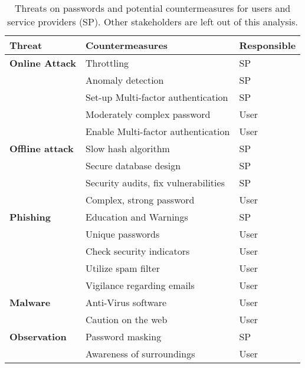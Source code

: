\begin{table}[htbp]
  \centering
  \caption{\label{table:rw:attacks_countermeasures}Threats on passwords and potential countermeasures for users and service providers (SP). Other stakeholders are left out of this analysis.}
    \begin{tabular}{rll}
    \multicolumn{1}{l}{\textbf{Threat}} & \textbf{Countermeasures} & \textbf{Responsible} \\
    \hline
    \multicolumn{1}{l}{\textbf{Online Attack}} & Throttling & SP \\
          & Anomaly detection & SP \\
          & Set-up Multi-factor authentication & SP \\
          & Moderately complex password & User \\
          & Enable Multi-factor authentication & User \\
    \multicolumn{1}{l}{\textbf{Offline attack}} 
        	& Slow hash algorithm & SP \\
			& Secure database design & SP \\
			& Security audits, fix vulnerabilities & SP \\
		    & Complex, strong password & User \\

    \multicolumn{1}{l}{\textbf{Phishing}} & Education and Warnings & SP \\
    & Unique passwords & User \\
          & Check security indicators & User \\
          & Utilize spam filter & User \\
          & Vigilance regarding emails & User \\
    \multicolumn{1}{l}{\textbf{Malware}} & Anti-Virus software & User \\
          & Caution on the web & User \\
    \multicolumn{1}{l}{\textbf{Observation}} & Password masking & SP \\
    	& Awareness of surroundings & User \\
    \end{tabular}%
\end{table}%